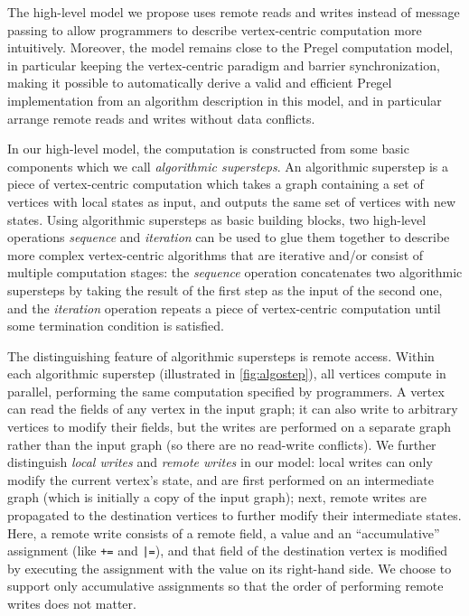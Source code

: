 \documentclass{sokendai_thesis} %
\begin{document}
The high-level model we propose uses remote reads and writes instead of message passing to allow programmers to describe vertex-centric computation more intuitively. %
Moreover, the model remains close to the Pregel computation model, in particular keeping the vertex-centric paradigm and barrier synchronization, making it possible to automatically derive a valid and efficient Pregel implementation from an algorithm description in this model, and in particular arrange remote reads and writes without data conflicts.

In our high-level model, the computation is constructed from some basic components which we call \emph{algorithmic supersteps}.
An algorithmic superstep is a piece of vertex-centric computation which takes a graph containing a set of vertices with local states as input, and outputs the same set of vertices with new states.
Using algorithmic supersteps as basic building blocks, two high-level operations \emph{sequence} and \emph{iteration} can be used to glue them together to describe more complex vertex-centric algorithms that are iterative and/or consist of multiple computation stages:
the \emph{sequence} operation concatenates two algorithmic supersteps by taking the result of the first step as the input of the second one, and the \emph{iteration} operation repeats a piece of vertex-centric computation until some termination condition is satisfied.

The distinguishing feature of algorithmic supersteps is remote access.
Within each algorithmic superstep (illustrated in \autoref{fig:algostep}), all vertices compute in parallel, performing the same computation specified by programmers.
A vertex can read the fields of any vertex in the input graph; it can also write to arbitrary vertices to modify their fields, but the writes are performed on a separate graph rather than the input graph (so there are no read-write conflicts).
We further distinguish \emph{local writes} and \emph{remote writes} in our model:
local writes can only modify the current vertex's state, and are first performed on an intermediate graph (which is initially a copy of the input graph);
next, remote writes are propagated to the destination vertices to further modify their intermediate states.
Here, a remote write consists of a remote field, a value and an ``accumulative'' assignment (like \texttt{+=} and \texttt{|=}), and that field of the destination vertex is modified by executing the assignment with the value on its right-hand side.
We choose to support only accumulative assignments so that the order of performing remote writes does not matter.
\end{document}
